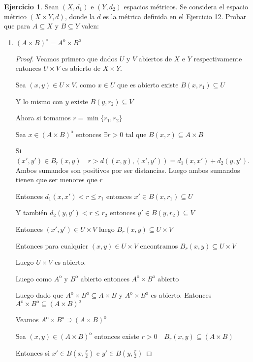 \documentclass[12pt]{report}
\newcommand{\open}{\mathrm{o}}
\theoremstyle{definition}
\newtheorem{ej}{Ejercicio}
\begin{document}
\newpage
\begin{ej}
  Sean $(X,d_{1})$ e $(Y,d_{2})$ espacios métricos. Se considera el espacio métrico $(X \times Y , d)$, donde la $d$ es la métrica definida en el Ejercicio 12. Probar que para $A \subseteq X$ y $B \subseteq Y$ valen: 
  \begin{enumerate}
    \item $(A\times B)^{\open} = A^{\open} \times B^{\open}$
      \begin{proof}

	Veamos primero que dados $U$ y $V$ abiertos de $X$ e $Y$ respectivamente entonces $U \times V$ es abierto de $X\times Y$.

	Sea $(x,y) \in U \times V$. como $x \in U$ que es abierto existe $B(x,r_{1}) \subseteq U$ 

	Y lo mismo con $y$ existe $B(y,r_{2}) \subseteq V$

	Ahora si tomamos $r = \min{\{r_{1},r_{2}\}}$
	
	Sea $x \in (A \times B)^{\open}$ entonces $\exists r>0$ tal que $B(x,r) \subseteq A \times B$

	Si $(x',y') \in B_{r}(x,y) \quad r > d((x,y),(x',y')) = d_{1}(x,x') + d_{2}(y,y') $. Ambos sumandos son positivos por ser distancias. Luego ambos sumandos tienen que ser menores que $r$

	Entonces $d_{1}(x,x') < r \leq r_{1} $ entonces $x' \in B(x,r_{1}) \subseteq U$

	Y también $d_{2}(y,y') < r \leq r_{2}$ entonces $y' \in B(y,r_{2}) \subseteq V$

	Entonces $(x',y') \in U \times V$ luego $B_{r}(x,y) \subseteq U \times V$

	Entonces para cualquier $(x,y) \in U \times V$ encontramos $B_{r}(x,y) \subseteq U \times V$

	Luego $U \times V$ es abierto.

	Luego como $A^{\open}$ y $B^{\open}$ abierto entonces $A^{\open} \times B^{\open}$ abierto 

	Luego dado que $A^{\open} \times B^{\open} \subseteq A \times B$ y $A^{\open} \times B^{\open}$ es abierto. Entonces $A^{\open} \times B^{\open} \subseteq (A \times B)^{\open}$

	Veamos $A^{\open} \times B^{\open} \supseteq (A \times B)^{\open}$

	Sea $(x,y) \in (A \times B)^{\open}$ entonces existe $r>0 \quad B_{r}(x,y) \subseteq (A \times B)$

	Entonces si $x' \in B(x,\frac{r}{2})$ e $y' \in B(y,\frac{r}{2})$


\end{proof}
\end{enumerate}
\end{ej}
\end{document}
